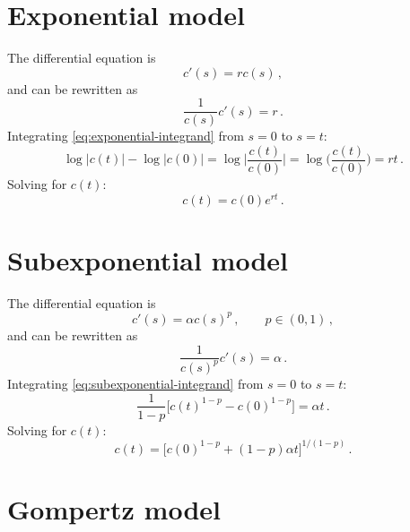 \documentclass[12pt]{article}
\begin{document}
\setlength{\parskip}{3mm}
\setlength{\parindent}{7mm}

\section{Exponential model}

The differential equation is
%
\begin{equation}
  c'(s) = r c(s)\,,
\end{equation}
%
and can be rewritten as
%
\begin{equation}
  \label{eq:exponential-integrand}
  \frac{1}{c(s)} c'(s) = r\,.
\end{equation}
%
Integrating \eqref{eq:exponential-integrand} from $s = 0$ to $s = t$:
%
\begin{equation}
  \log|c(t)| - \log|c(0)|
  = \log\bigg|\frac{c(t)}{c(0)}\bigg|
  = \log\bigg(\frac{c(t)}{c(0)}\bigg)
  = rt\,.
\end{equation}
%
Solving for $c(t)$:
%
\begin{equation}
  \label{eq:exponential}
  c(t) = c(0) e^{r t}\,.
\end{equation}


\section{Subexponential model}

The differential equation is
%
\begin{equation}
  c'(s) = \alpha c(s)^p\,,\qquad p \in (0,1)\,,
\end{equation}
%
and can be rewritten as
%
\begin{equation}
  \label{eq:subexponential-integrand}
  \frac{1}{c(s)^p} c'(s) = \alpha\,.
\end{equation}
%
Integrating \eqref{eq:subexponential-integrand} from $s = 0$ to $s = t$:
%
\begin{equation}
  \frac{1}{1 - p} \big[c(t)^{1 - p} - c(0)^{1 - p}\big] = \alpha t\,.
\end{equation}
%
Solving for $c(t)$:
%
\begin{equation}
  \label{eq:subexponential}
  c(t) = \big[c(0)^{1 - p} + (1 - p) \alpha t\big]^{1 / (1 - p)}\,.
\end{equation}


\section{Gompertz model}
\end{document}

